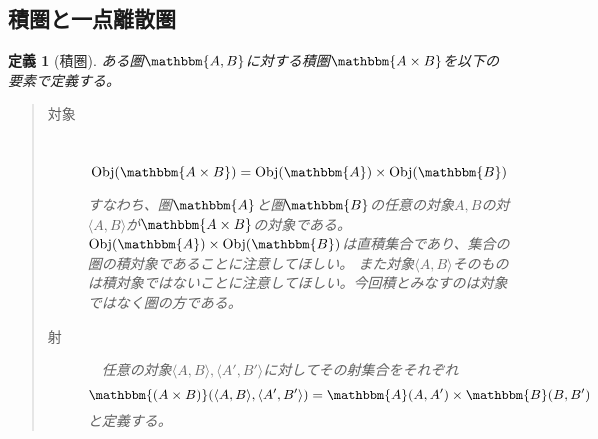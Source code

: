 \documentclass[dvipdfmx]{jsarticle}
\newcommand{\cat}[1]{\mathbbm{#1}}
\newcommand{\tuple}[1]{\langle #1\rangle}
\newcommand{\obj}[1]{\mathrm{Obj}(\cat{#1})}
\newcommand{\arset}[3]{\cat{#1}(#2,#3)}
\newtheorem{define}{定義}[section]
\numberwithin{proof}{subsection}
\numberwithin{prop}{subsection}
\numberwithin{define}{subsection}
\begin{document}
	\subsection{積圏と一点離散圏}
	\begin{define}[積圏]
		ある圏$\cat{A,B}$に対する積圏$\cat{A\times B}$を以下の要素で定義する。
		\begin{quote}
			\begin{description}
				\item[対象]　\[\obj{A\times B}=\obj{A}\times\obj{B}\]

				すなわち、圏$\cat{A}$と圏$\cat{B}$の任意の対象$A,B$の対$\tuple{A,B}$が$\cat{A\times B}$の対象である。
				$\obj{A}\times\obj{B}$は直積集合であり、集合の圏の積対象であることに注意してほしい。
				また対象$\tuple{A,B}$そのものは積対象ではないことに注意してほしい。今回積とみなすのは対象ではなく圏の方である。
				\item[射]　任意の対象$\tuple{A,B},\tuple{A',B'}$に対してその射集合をそれぞれ\[\arset{(A\times B)}{\tuple{A,B}}{\tuple{A',B'}}=\arset{A}{A}{A'}\times\arset{B}{B}{B'}\]と定義する。


\end{description}
\end{quote}
\end{define}
\end{document}
